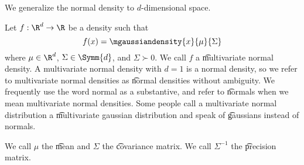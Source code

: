 

We generalize the normal density
to $d$-dimensional space.


Let $f: \R^d \to \R$ be a density such that $$f(x) = \mgaussiandensity{x}{\mu}{\Sigma}$$ where $\mu \in \R^d$, $\Sigma \in \Symm{d}$, and $\Sigma \succ 0$.
We call $f$ a \t{multivariate normal density}.
A multivariate normal density with $d = 1$ is a normal density, so we refer to multivariate normal densities as \t{normal densities} without ambiguity.
We frequently use the word normal as a substantive, and refer to \t{normals} when we mean multivariate normal densities.
Some people call a multivariate normal distribution a \t{multivariate gaussian distribution} and speak of \t{gaussians} instead of normals.

We call $\mu$ the \t{mean} and $\Sigma$ the \t{covariance matrix}.
We call $\Sigma^{-1}$ the \t{precision matrix}.
